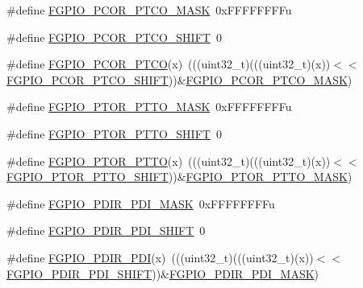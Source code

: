 \begin{DoxyCompactItemize}
\item 
\#define \hyperlink{group___f_g_p_i_o___register___masks_ga07265e812fba9f953394d6e9dfe82aab}{F\+G\+P\+I\+O\+\_\+\+P\+C\+O\+R\+\_\+\+P\+T\+C\+O\+\_\+\+M\+A\+SK}~0x\+F\+F\+F\+F\+F\+F\+F\+Fu
\item 
\#define \hyperlink{group___f_g_p_i_o___register___masks_gaa72cbc41d1494dfea7662eede74ee2a1}{F\+G\+P\+I\+O\+\_\+\+P\+C\+O\+R\+\_\+\+P\+T\+C\+O\+\_\+\+S\+H\+I\+FT}~0
\item 
\#define \hyperlink{group___f_g_p_i_o___register___masks_ga3e6a01871116d6b24b154bd78ff62963}{F\+G\+P\+I\+O\+\_\+\+P\+C\+O\+R\+\_\+\+P\+T\+CO}(x)~(((uint32\+\_\+t)(((uint32\+\_\+t)(x))$<$$<$\hyperlink{group___f_g_p_i_o___register___masks_gaa72cbc41d1494dfea7662eede74ee2a1}{F\+G\+P\+I\+O\+\_\+\+P\+C\+O\+R\+\_\+\+P\+T\+C\+O\+\_\+\+S\+H\+I\+FT}))\&\hyperlink{group___f_g_p_i_o___register___masks_ga07265e812fba9f953394d6e9dfe82aab}{F\+G\+P\+I\+O\+\_\+\+P\+C\+O\+R\+\_\+\+P\+T\+C\+O\+\_\+\+M\+A\+SK})
\item 
\#define \hyperlink{group___f_g_p_i_o___register___masks_gab0e5427135589fc107fe4b465e5c767f}{F\+G\+P\+I\+O\+\_\+\+P\+T\+O\+R\+\_\+\+P\+T\+T\+O\+\_\+\+M\+A\+SK}~0x\+F\+F\+F\+F\+F\+F\+F\+Fu
\item 
\#define \hyperlink{group___f_g_p_i_o___register___masks_gae2127729a1021dc8d34d55a758102213}{F\+G\+P\+I\+O\+\_\+\+P\+T\+O\+R\+\_\+\+P\+T\+T\+O\+\_\+\+S\+H\+I\+FT}~0
\item 
\#define \hyperlink{group___f_g_p_i_o___register___masks_gad88e5aa39295cd2c0d225f417f6c741a}{F\+G\+P\+I\+O\+\_\+\+P\+T\+O\+R\+\_\+\+P\+T\+TO}(x)~(((uint32\+\_\+t)(((uint32\+\_\+t)(x))$<$$<$\hyperlink{group___f_g_p_i_o___register___masks_gae2127729a1021dc8d34d55a758102213}{F\+G\+P\+I\+O\+\_\+\+P\+T\+O\+R\+\_\+\+P\+T\+T\+O\+\_\+\+S\+H\+I\+FT}))\&\hyperlink{group___f_g_p_i_o___register___masks_gab0e5427135589fc107fe4b465e5c767f}{F\+G\+P\+I\+O\+\_\+\+P\+T\+O\+R\+\_\+\+P\+T\+T\+O\+\_\+\+M\+A\+SK})
\item 
\#define \hyperlink{group___f_g_p_i_o___register___masks_ga49077fe6b4cbd499bfa84f4b4c1be74c}{F\+G\+P\+I\+O\+\_\+\+P\+D\+I\+R\+\_\+\+P\+D\+I\+\_\+\+M\+A\+SK}~0x\+F\+F\+F\+F\+F\+F\+F\+Fu
\item 
\#define \hyperlink{group___f_g_p_i_o___register___masks_gaadc2ff381ef7eb1254eaab329f935aae}{F\+G\+P\+I\+O\+\_\+\+P\+D\+I\+R\+\_\+\+P\+D\+I\+\_\+\+S\+H\+I\+FT}~0
\item 
\#define \hyperlink{group___f_g_p_i_o___register___masks_gaa197ae1640b4c22ba461518f607c5608}{F\+G\+P\+I\+O\+\_\+\+P\+D\+I\+R\+\_\+\+P\+DI}(x)~(((uint32\+\_\+t)(((uint32\+\_\+t)(x))$<$$<$\hyperlink{group___f_g_p_i_o___register___masks_gaadc2ff381ef7eb1254eaab329f935aae}{F\+G\+P\+I\+O\+\_\+\+P\+D\+I\+R\+\_\+\+P\+D\+I\+\_\+\+S\+H\+I\+FT}))\&\hyperlink{group___f_g_p_i_o___register___masks_ga49077fe6b4cbd499bfa84f4b4c1be74c}{F\+G\+P\+I\+O\+\_\+\+P\+D\+I\+R\+\_\+\+P\+D\+I\+\_\+\+M\+A\+SK})
$$
\end{DoxyCompactItemize}
